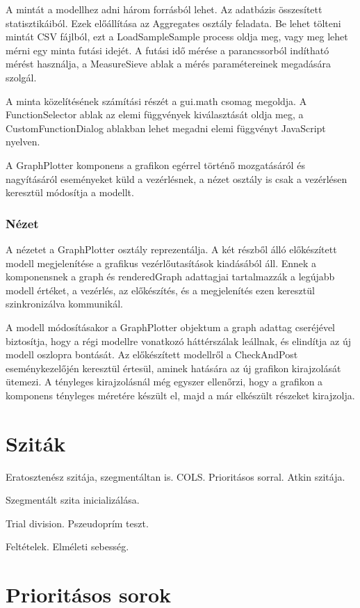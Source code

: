 A mintát a modellhez adni három forrásból lehet.
Az adatbázis összesített statisztikáiból.
Ezek előállítása az Aggregates osztály feladata.
Be lehet tölteni mintát CSV fájlból, ezt a LoadSampleSample process oldja meg, vagy meg lehet mérni egy minta futási idejét. A futási idő mérése a parancssorból indítható mérést használja, a MeasureSieve ablak a mérés paramétereinek megadására szolgál.

A minta közelítésének számítási részét a gui.math csomag megoldja. A FunctionSelector ablak az elemi függvények kiválasztását oldja meg, a CustomFunctionDialog ablakban lehet megadni elemi függvényt JavaScript nyelven.

A GraphPlotter komponens a grafikon egérrel történő mozgatásáról és nagyításáról eseményeket küld a vezérlésnek, a nézet osztály is csak a vezérlésen keresztül módosítja a modellt.

\subsubsection{Nézet}

A nézetet a GraphPlotter osztály reprezentálja.
A két részből álló előkészített modell megjelenítése a grafikus vezérlőutasítások kiadásából áll.
Ennek a komponensnek a graph és renderedGraph adattagjai tartalmazzák a legújabb modell értéket, a vezérlés, az előkészítés, és a megjelenítés ezen keresztül szinkronizálva kommunikál.

A modell módosításakor a GraphPlotter objektum a graph adattag cseréjével biztosítja, hogy a régi modellre vonatkozó háttérszálak leállnak, és elindítja az új modell oszlopra bontását.
Az előkészített modellről a CheckAndPost eseménykezelőjén keresztül értesül, aminek hatására az új grafikon kirajzolását ütemezi.
A tényleges kirajzolásnál még egyszer ellenőrzi, hogy a grafikon a komponens tényleges méretére készült el, majd a már elkészült részeket kirajzolja.

\section{Sziták}

Eratosztenész szitája, szegmentáltan is. COLS. Prioritásos sorral. Atkin szitája.

Szegmentált szita inicializálása.

Trial division. Pszeudoprím teszt.

Feltételek. Elméleti sebesség.

\section{Prioritásos sorok}

